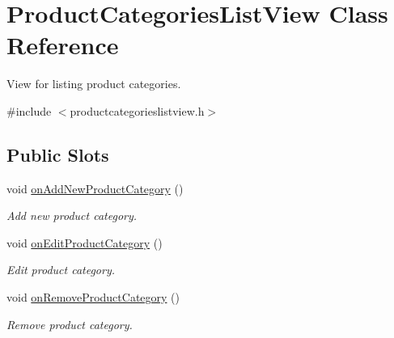 \hypertarget{class_product_categories_list_view}{\section{\-Product\-Categories\-List\-View \-Class \-Reference}
\label{class_product_categories_list_view}
}


\-View for listing product categories.  




{\ttfamily \#include $<$productcategorieslistview.\-h$>$}

\subsection*{\-Public \-Slots}
\begin{DoxyCompactItemize}
\item 
void \hyperlink{class_product_categories_list_view_a446236edd1eb106b3187177f4e98aa34}{on\-Add\-New\-Product\-Category} ()
\begin{DoxyCompactList}\small\item\em \-Add new product category. \end{DoxyCompactList}\item 
void \hyperlink{class_product_categories_list_view_a5b34464423d10b625af8b4ded2fab7a2}{on\-Edit\-Product\-Category} ()
\begin{DoxyCompactList}\small\item\em \-Edit product category. \end{DoxyCompactList}\item 
void \hyperlink{class_product_categories_list_view_a6c33dbccb3a127798abc0ecef6f336ed}{on\-Remove\-Product\-Category} ()
\begin{DoxyCompactList}\small\item\em \-Remove product category. \end{DoxyCompactList}\end{DoxyCompactItemize}
